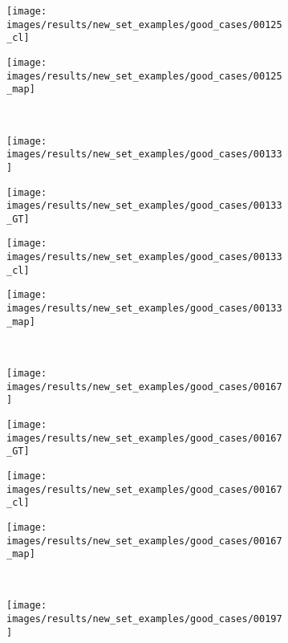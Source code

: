 \begin{figure}[t]
\begin{subfigure}[c]{0.24\textwidth}
  \centering
  \texttt{[image: images/results/new\_set\_examples/good\_cases/00125\_cl]}
 \end{subfigure}
 \begin{subfigure}[c]{0.24\textwidth}
  \centering
  \texttt{[image: images/results/new\_set\_examples/good\_cases/00125\_map]}
 \end{subfigure}
 \\
 \begin{subfigure}[c]{0.24\textwidth}
  \centering
  \texttt{[image: images/results/new\_set\_examples/good\_cases/00133]}
 \end{subfigure}
 \begin{subfigure}[c]{0.24\textwidth}
  \centering
  \texttt{[image: images/results/new\_set\_examples/good\_cases/00133\_GT]}
 \end{subfigure}
 \begin{subfigure}[c]{0.24\textwidth}
  \centering
  \texttt{[image: images/results/new\_set\_examples/good\_cases/00133\_cl]}
 \end{subfigure}
 \begin{subfigure}[c]{0.24\textwidth}
  \centering
  \texttt{[image: images/results/new\_set\_examples/good\_cases/00133\_map]}
 \end{subfigure}
 \\
 \begin{subfigure}[c]{0.24\textwidth}
  \centering
  \texttt{[image: images/results/new\_set\_examples/good\_cases/00167]}
 \end{subfigure}
 \begin{subfigure}[c]{0.24\textwidth}
  \centering
  \texttt{[image: images/results/new\_set\_examples/good\_cases/00167\_GT]}
 \end{subfigure}
 \begin{subfigure}[c]{0.24\textwidth}
  \centering
  \texttt{[image: images/results/new\_set\_examples/good\_cases/00167\_cl]}
 \end{subfigure}
 \begin{subfigure}[c]{0.24\textwidth}
  \centering
  \texttt{[image: images/results/new\_set\_examples/good\_cases/00167\_map]}
 \end{subfigure}
 \\
 \begin{subfigure}[c]{0.24\textwidth}
  \centering
  \texttt{[image: images/results/new\_set\_examples/good\_cases/00197]}

\end{subfigure}
\end{figure}
